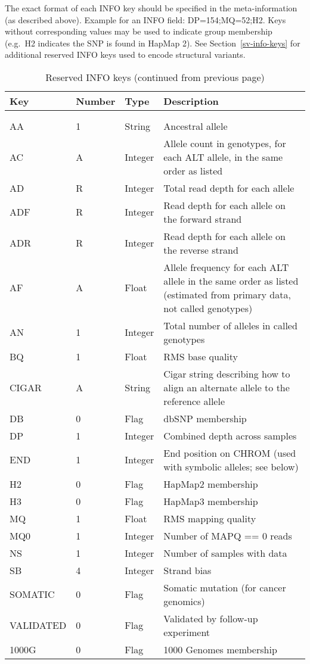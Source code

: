 \documentclass[8pt]{article}
\begin{document}
\begin{enumerate}
  The exact format of each INFO key should be specified in the meta-information (as described above).
  Example for an INFO field: DP=154;MQ=52;H2.
  Keys without corresponding values may be used to indicate group membership (e.g.\ H2 indicates the SNP is found in HapMap 2).
  See Section~\ref{sv-info-keys} for additional reserved INFO keys used to encode structural variants.
\end{enumerate}

\begin{longtable}[c]{ | p{2.5cm} | p{1.5cm} | p{1.5cm} | p{10.3cm} | }
	\hline
	Key		& Number	& Type		& Description \\ \hline
  \endhead
    \hline
    \multicolumn{4}{l}{} \\
    \caption{\label{table:reserved-info}Reserved INFO keys (continued on next page)}
  \endfoot
    \hline
    \multicolumn{4}{l}{} \\
    \caption{Reserved INFO keys (continued from previous page)}
  \endlastfoot
	AA		& 1		& String	& Ancestral allele \\
	AC		& A		& Integer	& Allele count in genotypes, for each ALT allele, in the same order as listed  \\
	AD		& R		& Integer	& Total read depth for each allele \\
	ADF		& R		& Integer	& Read depth for each allele on the forward strand \\
	ADR		& R		& Integer	& Read depth for each allele on the reverse strand \\
	AF		& A		& Float		& Allele frequency for each ALT allele in the same order as listed (estimated from primary data, not called genotypes) \\
	AN		& 1		& Integer	& Total number of alleles in called genotypes \\
	BQ   		& 1		& Float		& RMS base quality \\
	CIGAR		& A		& String	& Cigar string describing how to align an alternate allele to the reference allele \\
	DB		& 0		& Flag		& dbSNP membership \\
	DP		& 1		& Integer	& Combined depth across samples \\
	END		& 1		& Integer	& End position on CHROM (used with symbolic alleles; see below) \\
	H2		& 0		& Flag		& HapMap2 membership \\
	H3		& 0		& Flag		& HapMap3 membership \\
	MQ		& 1		& Float		& RMS mapping quality \\
	MQ0   		& 1		& Integer	& Number of MAPQ == 0 reads \\
	NS		& 1		& Integer	& Number of samples with data \\
	SB		& 4		& Integer	& Strand bias \\
	SOMATIC		& 0		& Flag		& Somatic mutation (for cancer genomics) \\
	VALIDATED	& 0		& Flag		& Validated by follow-up experiment \\
	1000G		& 0		& Flag		& 1000 Genomes membership \\
\end{longtable}
\end{document}
